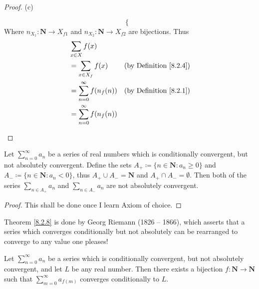 \begin{proof}{(c)}
\begin{enumerate}[label=(\Roman*)]
\begin{enumerate}[label=(\roman*)]
\[\begin{cases}
                            \end{cases}
                        \]
                        Where \(n_{X_1} : \mathbf{N} \to X_{f1}\) and \(n_{X_2} : \mathbf{N} \to X_{f2}\) are bijections.
                        Thus
                        \begin{align*}
                             & \sum_{x \in X} f(x)                                                  \\
                             & = \sum_{x \in X_f} f(x)         & \text{(by Definition \ref{8.2.4})} \\
                             & = \sum_{n = 0}^\infty f(n_f(n)) & \text{(by Definition \ref{8.2.1})} \\
                             & = \sum_{n = 0}^\infty f(n_f(n))
                        \end{align*}
              \end{enumerate}
    \end{enumerate}
\end{proof}

\begin{lemma}\label{8.2.7}
    Let \(\sum_{n = 0}^\infty a_n\) be a series of real numbers which is conditionally convergent, but not absolutely convergent.
    Define the sets \(A_+ \coloneqq \{n \in \mathbf{N} : a_n \geq 0\}\) and \(A_- \coloneqq \{n \in \mathbf{N} : a_n < 0\}\), thus \(A_+ \cup A_- = \mathbf{N}\) and \(A_+ \cap A_- = \emptyset\).
    Then both of the series \(\sum_{n \in A_+} a_n\) and \(\sum_{n \in A_-} a_n\) are not absolutely convergent.
\end{lemma}

\begin{proof}
    This shall be done once I learn Axiom of choice.
\end{proof}

\begin{note}
    Theorem \ref{8.2.8} is done by Georg Riemann (1826 -- 1866), which asserts that a series which converges conditionally but not absolutely can be rearranged to converge to any value one pleases!
\end{note}

\begin{theorem}\label{8.2.8}
    Let \(\sum_{n = 0}^\infty a_n\) be a series which is conditionally convergent, but not absolutely convergent, and let \(L\) be any real number.
    Then there exists a bijection \(f : \mathbf{N} \to \mathbf{N}\) such that \(\sum_{m = 0}^\infty a_{f(m)}\) converges conditionally to \(L\).
\end{theorem}

